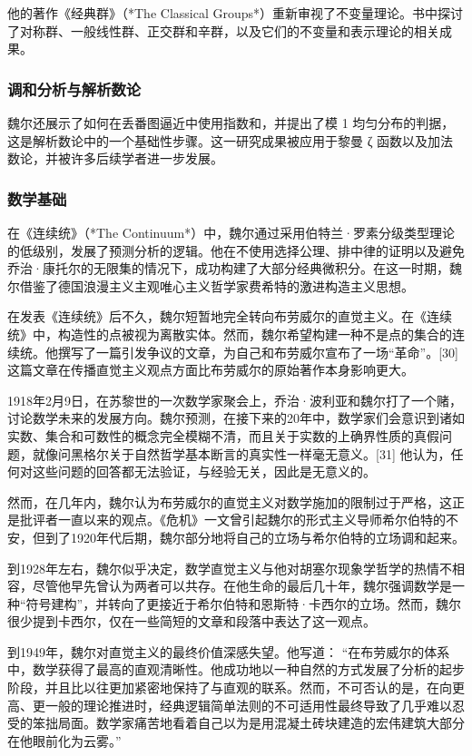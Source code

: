 他的著作《经典群》（*The Classical Groups*）重新审视了不变量理论。书中探讨了对称群、一般线性群、正交群和辛群，以及它们的不变量和表示理论的相关成果。
\subsubsection{调和分析与解析数论} 
魏尔还展示了如何在丢番图逼近中使用指数和，并提出了模 1 均匀分布的判据，这是解析数论中的一个基础性步骤。这一研究成果被应用于黎曼 ζ 函数以及加法数论，并被许多后续学者进一步发展。
\subsubsection{数学基础}
在《连续统》（*The Continuum*）中，魏尔通过采用伯特兰·罗素分级类型理论的低级别，发展了预测分析的逻辑。他在不使用选择公理、排中律的证明以及避免乔治·康托尔的无限集的情况下，成功构建了大部分经典微积分。在这一时期，魏尔借鉴了德国浪漫主义主观唯心主义哲学家费希特的激进构造主义思想。  

在发表《连续统》后不久，魏尔短暂地完全转向布劳威尔的直觉主义。在《连续统》中，构造性的点被视为离散实体。然而，魏尔希望构建一种不是点的集合的连续统。他撰写了一篇引发争议的文章，为自己和布劳威尔宣布了一场“革命”。[30] 这篇文章在传播直觉主义观点方面比布劳威尔的原始著作本身影响更大。  

1918年2月9日，在苏黎世的一次数学家聚会上，乔治·波利亚和魏尔打了一个赌，讨论数学未来的发展方向。魏尔预测，在接下来的20年中，数学家们会意识到诸如实数、集合和可数性的概念完全模糊不清，而且关于实数的上确界性质的真假问题，就像问黑格尔关于自然哲学基本断言的真实性一样毫无意义。[31] 他认为，任何对这些问题的回答都无法验证，与经验无关，因此是无意义的。  

然而，在几年内，魏尔认为布劳威尔的直觉主义对数学施加的限制过于严格，这正是批评者一直以来的观点。《危机》一文曾引起魏尔的形式主义导师希尔伯特的不安，但到了1920年代后期，魏尔部分地将自己的立场与希尔伯特的立场调和起来。  

到1928年左右，魏尔似乎决定，数学直觉主义与他对胡塞尔现象学哲学的热情不相容，尽管他早先曾认为两者可以共存。在他生命的最后几十年，魏尔强调数学是一种“符号建构”，并转向了更接近于希尔伯特和恩斯特·卡西尔的立场。然而，魏尔很少提到卡西尔，仅在一些简短的文章和段落中表达了这一观点。  

到1949年，魏尔对直觉主义的最终价值深感失望。他写道：  
“在布劳威尔的体系中，数学获得了最高的直观清晰性。他成功地以一种自然的方式发展了分析的起步阶段，并且比以往更加紧密地保持了与直观的联系。然而，不可否认的是，在向更高、更一般的理论推进时，经典逻辑简单法则的不可适用性最终导致了几乎难以忍受的笨拙局面。数学家痛苦地看着自己以为是用混凝土砖块建造的宏伟建筑大部分在他眼前化为云雾。”  

